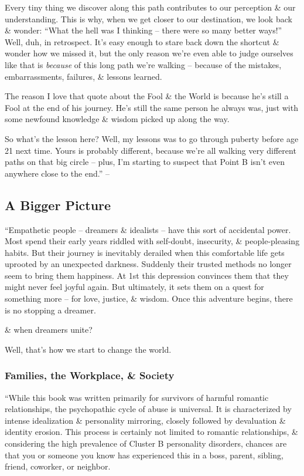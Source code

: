 \documentclass{article}
\numberwithin{equation}{section}
\begin{document}
Every tiny thing we discover along this path contributes to our perception \& our understanding. This is why, when we get closer to our destination, we look back \& wonder: ``What the hell was I thinking -- there were so many better ways!'' Well, duh, in retrospect. It's easy enough to stare back down the shortcut \& wonder how we missed it, but the only reason we're even able to judge ourselves like that is \textit{because} of this long path we're walking -- because of the mistakes, embarrassments, failures, \& lessons learned.

The reason I love that quote about the Fool \& the World is because he's still a Fool at the end of his journey. He's still the same person he always was, just with some newfound knowledge \& wisdom picked up along the way.

So what's the lesson here? Well, my lessons was to go through puberty before age 21 next time. Yours is probably different, because we're all walking very different paths on that big circle -- plus, I'm starting to suspect that Point B isn't even anywhere close to the end.'' -- \cite[pp. 185--188]{MacKenzie2015}

\subsection{A Bigger Picture}
``Empathetic people -- dreamers \& idealists -- have  this sort of accidental power. Most spend their early years riddled with self-doubt, insecurity, \& people-pleasing habits. But their journey is inevitably derailed when this comfortable life gets uprooted by an unexpected darkness. Suddenly their trusted methods no longer seem to bring them happiness. At 1st this depression convinces them that they might never feel joyful again. But ultimately, it sets them on a quest for something more -- for love, justice, \& wisdom. Once this adventure begins, there is no stopping a dreamer.

\& when dreamers unite?

Well, that's how we start to change the world.

\subsubsection{Families, the Workplace, \& Society}
``While this book was written primarily for survivors of harmful romantic relationships, the psychopathic cycle of abuse is universal. It is characterized by intense idealization \& personality mirroring, closely followed by devaluation \& identity erosion. This process is certainly not limited to romantic relationships, \& considering the high prevalence of Cluster B personality disorders, chances are that you or someone you know has experienced this in a boss, parent, sibling, friend, coworker, or neighbor.
\end{document}
